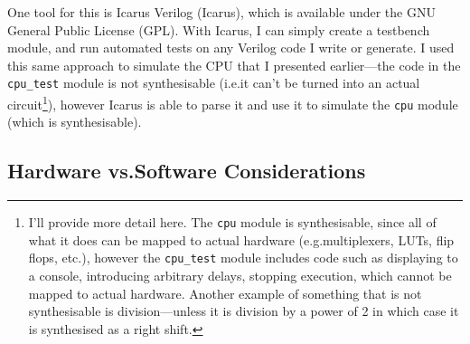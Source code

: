 \documentclass[12pt]{article}
\begin{document}
One tool for this is Icarus Verilog (Icarus), which is available under the GNU General Public License (GPL). With Icarus, I can simply create a testbench module, and run automated tests on any Verilog code I write or generate. I used this same approach to simulate the CPU that I presented earlier---the code in the \lstinline[language=Verilog]|cpu_test| module is not synthesisable (i.e.\@ it can't be turned into an actual circuit\footnote{I'll provide more detail here. The \lstinline[language=Verilog]|cpu| module is synthesisable, since all of what it does can be mapped to actual hardware (e.g.\@ multiplexers, LUTs, flip flops, etc.\@), however the \lstinline[language=Verilog]|cpu_test| module includes code such as displaying to a console, introducing arbitrary delays, stopping execution, which cannot be mapped to actual hardware. Another example of something that is not synthesisable is division---unless it is division by a power of 2 in which case it is synthesised as a right shift.}), however Icarus is able to parse it and use it to simulate the \lstinline[language=Verilog]|cpu| module (which is synthesisable).

\subsection{Hardware vs.\@ Software Considerations}
\end{document}
